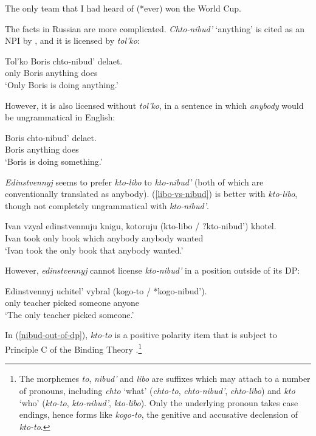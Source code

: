 \documentclass{article}
\begin{document}
\begin{exe}
	\ex The only team that I had heard of (*ever) won the World Cup.
\end{exe}

The facts in Russian are more complicated. \textit{Chto-nibud'} `anything' is cited as an NPI by \citet{}, and it is licensed by \textit{tol'ko}:

\begin{exe}
	\ex \gll Tol'ko Boris chto-nibud' delaet.\\
	only Boris anything does\\
	\glt `Only Boris is doing anything.'
\end{exe}

However, it is also licensed without \textit{tol'ko}, in a sentence in which \textit{anybody} would be ungrammatical in English:

\begin{exe}
	\ex \label{nibud-no-polarity} \gll Boris chto-nibud' delaet.\\
	Boris anything does\\
	\glt `Boris is doing something.' %
\end{exe}

\textit{Edinstvennyj} seems to prefer \textit{kto-libo} to \textit{kto-nibud'} (both of which are conventionally translated as anybody). (\ref{libo-vs-nibud}) is better with \textit{kto-libo}, though not completely ungrammatical with \textit{kto-nibud'}.

\begin{exe}
	\ex \label{libo-vs-nibud} \gll Ivan vzyal edinstvennuju knigu, kotoruju (kto-libo / ?kto-nibud') khotel.\\
	Ivan took only book which anybody {} anybody wanted\\
	\glt `Ivan took the only book that anybody wanted.'
\end{exe}

However, \textit{edinstvennyj} cannot license \textit{kto-nibud'} in a position outside of its DP:

\begin{exe}
	\ex \label{nibud-out-of-dp} \gll Edinstvennyj uchitel' vybral (kogo-to / *kogo-nibud').\\
	only teacher picked someone {} anyone\\
	\glt `The only teacher picked someone.'
\end{exe}

In (\ref{nibud-out-of-dp}), \textit{kto-to}	is a positive polarity item that is subject to Principle C of the Binding Theory \citep{russneg}.\footnote{The morphemes \textit{to}, \textit{nibud'} and \textit{libo} are suffixes which may attach to a number of pronouns, including \textit{chto} `what' (\textit{chto-to}, \textit{chto-nibud'}, \textit{chto-libo}) and \textit{kto} `who' (\textit{kto-to}, \textit{kto-nibud'}, \textit{kto-libo}). Only the underlying pronoun takes case endings, hence forms like \textit{kogo-to}, the genitive and accusative declension of \textit{kto-to}.}
\end{document}
